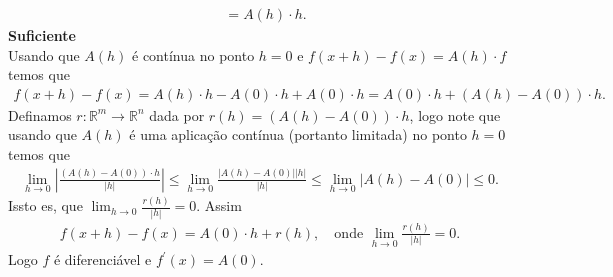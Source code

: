 \begin{homeworkProblem}
\begin{solution}
\begin{align*}
      &=A(h)\cdot h.
    \end{align*}
  \textbf{Suficiente}\\
    Usando que $A(h)$ é contínua no ponto $h=0$ e $f(x+h)-f(x)=A(h)\cdot f$ temos que
    \begin{align*}
      f(x+h)-f(x)=A(h)\cdot h - A(0)\cdot h+A(0)\cdot h=A(0)\cdot h + \left( A(h)-A(0) \right)\cdot h.
    \end{align*}
    Definamos $r:\mathbb{R}^{m}\to\mathbb{R}^{n}$ dada por $r(h)=\left( A(h)-A(0) \right)\cdot h$, logo note que usando que $A(h)$ é uma aplicação contínua (portanto limitada) no ponto $h=0$ temos que 
    \begin{align*}
      \lim_{h \to 0}\left|\frac{\left( A(h)-A(0) \right)\cdot h}{|h|}\right|\leq \lim_{h \to 0}\frac{|A(h)-A(0)||h|}{|h|}\leq \lim_{h \to 0}|A(h)-A(0)|\leq 0.
    \end{align*}
    Issto es, que $\lim_{h \to 0}\frac{r(h)}{|h|}=0$. Assim
    \begin{align*}
      f(x+h)-f(x)=A(0)\cdot h+r(h),\quad\text{onde }\lim_{h \to 0}\frac{r(h)}{|h|}=0.
    \end{align*}
    Logo $f$ é diferenciável e $f^{\prime}(x)=A(0)$. 
  \end{solution}
\end{homeworkProblem}

